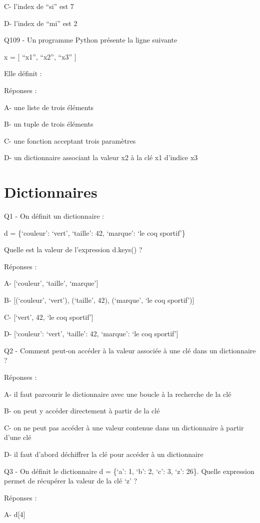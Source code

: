 \documentclass[
]{book}
\begin{document}
C- l'index de ``si'' est 7

D- l'index de ``mi'' est 2

Q109 - Un programme Python présente la ligne suivante

x = {[} ``x1'', ``x2'', ``x3'' {]}

Elle définit :

Réponses :

A- une liste de trois éléments

B- un tuple de trois éléments

C- une fonction acceptant trois paramètres

D- un dictionnaire associant la valeur x2 à la clé x1 d'indice x3

\hypertarget{dictionnaires}{%
\section{Dictionnaires}\label{dictionnaires}}

Q1 - On définit un dictionnaire :

d = \{`couleur': `vert', `taille': 42, `marque': `le coq sportif'\}

Quelle est la valeur de l'expression d.keys() ?

Réponses :

A- {[}`couleur', `taille', `marque'{]}

B- {[}(`couleur', `vert'), (`taille', 42), (`marque', `le coq sportif'){]}

C- {[}`vert', 42, `le coq sportif'{]}

D- {[}`couleur': `vert', `taille': 42, `marque': `le coq sportif'{]}

Q2 - Comment peut-on accéder à la valeur associée à une clé dans un dictionnaire ?

Réponses :

A- il faut parcourir le dictionnaire avec une boucle à la recherche de la clé

B- on peut y accéder directement à partir de la clé

C- on ne peut pas accéder à une valeur contenue dans un dictionnaire à partir d'une clé

D- il faut d'abord déchiffrer la clé pour accéder à un dictionnaire

Q3 - On définit le dictionnaire d = \{`a': 1, `b': 2, `c': 3, `z': 26\}. Quelle expression permet de récupérer la valeur de la clé `z' ?

Réponses :

A- d{[}4{]}
\end{document}
